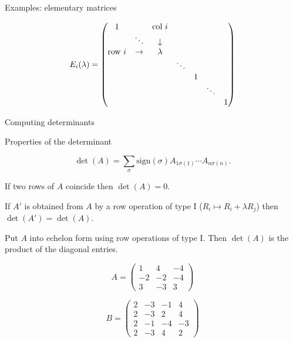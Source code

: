 \documentclass{beamer}
\begin{document}
\begin{frame}
{Examples: elementary matrices}


\[E_{i}(\lambda)=\begin{pmatrix} 1 & & \mbox{col }i & & & & \\ &
\ddots & \downarrow & & & & \\ \mbox{row }i&\rightarrow & \lambda &
& & &\\ & & & \ddots & & & \\ & & & & 1 & & \\ & & & & & \ddots
&\\ & & & & & & 1 \end{pmatrix}\]


\end{frame}
\begin{frame}
\begin{center}
{\huge Computing determinants}
\end{center}


\end{frame}
\begin{frame}
{Properties of the determinant}


\[\det(A)=\sum_{\sigma}\mathrm{sign}(\sigma)A_{1\sigma(1)}\cdots A_{n\sigma(n)}.\]
\begin{Lemma}
If two rows of \(A\) coincide then \(\det(A)=0\).


\end{Lemma}
\begin{Lemma}
If \(A'\) is obtained from \(A\) by a row operation of type I
(\(R_i\mapsto R_i+\lambda R_j\)) then \(\det(A')=\det(A)\).


\end{Lemma}
\begin{Corollary}
Put \(A\) into echelon form using row operations of type I. Then
\(\det(A)\) is the product of the diagonal entries.


\end{Corollary}
\end{frame}
\begin{frame}
\begin{Example}
\[A=\begin{pmatrix} 1 & 4 & -4 \\ -2 & -2 & -4 \\ 3 & -3 & 3
\end{pmatrix}\]


\end{Example}
\begin{Example}
\[B=\begin{pmatrix} 2 & -3 & -1 & 4 \\ 2 & -3 & 2 & 4 \\ 2 & -1 &
-4 & -3 \\ 2 & -3 & 4 & 2 \end{pmatrix}\]


\end{Example}
\end{frame}
\end{document}

